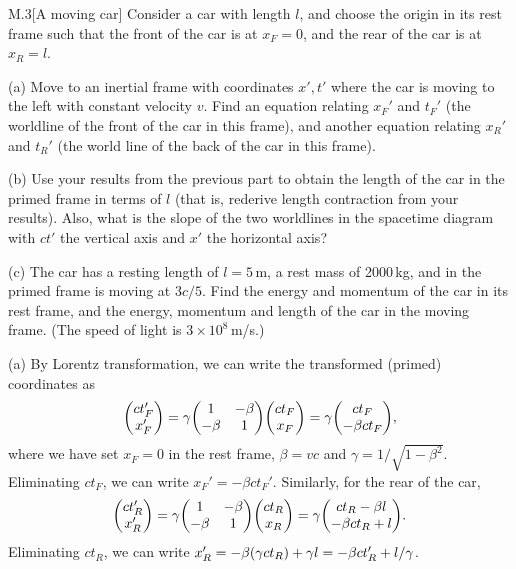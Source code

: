 \documentclass[12pt]{article}
\begin{document}
\newpage
\begin{problem}{M.3}[A moving car]
Consider a car with length $l$, and choose the origin in its rest frame such
that the front of the car is at $x_F=0$, and the rear of the car is at $x_R=l$.

(a) Move to an inertial frame with coordinates $x',t'$ where the car is moving
to the left with constant velocity $v$. Find an equation relating $x_F'$ and
$t_F'$ (the worldline of the front of the car in this frame), and another
equation relating $x_R'$ and $t_R'$ (the world line of the back of the car in
this frame).

(b) Use your results from the previous part to obtain the length of the car in
the primed frame in terms of $l$ (that is, rederive length contraction from your
results). Also, what is the slope of the two worldlines in the spacetime diagram
with $ct'$ the vertical axis and $x'$ the horizontal axis?

(c) The car has a resting length of $l=5$\,\si{m}, a rest mass of 2000\,\si{kg},
and in the primed frame is moving at $3c/5$. Find the energy and momentum of the
car in its rest frame, and the energy, momentum and length of the car in the
moving frame. (The speed of light is $3\times10^8$\,\si{m/s}.)
\begin{solution}
(a) By Lorentz transformation, we can write the transformed (primed) coordinates
as
\begin{equation}
    \mqty(ct_F'\\x_F')=\gamma\mqty(1&-\beta\\-\beta&1)\mqty(ct_F\\x_F)
    =\gamma\mqty(ct_F\\-\beta ct_F),
\end{equation}
where we have set $x_F=0$ in the rest frame, $\beta=vc$ and
$\gamma=1/\sqrt{1-\beta^2}$. Eliminating $ct_F$, we can write $x_F'=-\beta
ct_F'$. Similarly, for the rear of the car,
\begin{equation}
    \mqty(ct_R'\\x_R')=\gamma\mqty(1&-\beta\\-\beta&1)\mqty(ct_R\\x_R)
    =\gamma\mqty(ct_R-\beta l\\-\beta ct_R+l).
\end{equation}
Eliminating $ct_R$, we can write $x_R'=-\beta\qty(\gamma ct_R)+\gamma l
=-\beta ct_R'+l/\gamma$.


\end{solution}
\end{problem}
\end{document}

